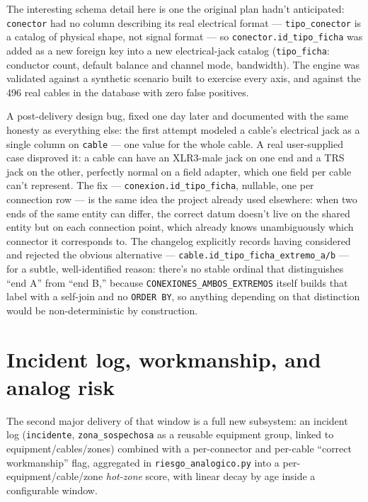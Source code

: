 \documentclass[10.4pt,twocolumn]{article}
\begin{document}
The interesting schema detail here is one the original plan hadn't anticipated: \texttt{conector} had no column describing its real electrical format --- \texttt{tipo\_conector} is a catalog of physical shape, not signal format --- so \texttt{conector.id\_tipo\_ficha} was added as a new foreign key into a new electrical-jack catalog (\texttt{tipo\_ficha}: conductor count, default balance and channel mode, bandwidth). The engine was validated against a synthetic scenario built to exercise every axis, and against the 496 real cables in the database with zero false positives.

A post-delivery design bug, fixed one day later and documented with the same honesty as everything else: the first attempt modeled a cable's electrical jack as a single column on \texttt{cable} --- one value for the whole cable. A real user-supplied case disproved it: a cable can have an XLR3-male jack on one end and a TRS jack on the other, perfectly normal on a field adapter, which one field per cable can't represent. The fix --- \texttt{conexion.id\_tipo\_ficha}, nullable, one per connection row --- is the same idea the project already used elsewhere: when two ends of the same entity can differ, the correct datum doesn't live on the shared entity but on each connection point, which already knows unambiguously which connector it corresponds to. The changelog explicitly records having considered and rejected the obvious alternative --- \texttt{cable.id\_tipo\_ficha\_extremo\_a/b} --- for a subtle, well-identified reason: there's no stable ordinal that distinguishes ``end A'' from ``end B,'' because \texttt{CONEXIONES\_AMBOS\_EXTREMOS} itself builds that label with a self-join and no \texttt{ORDER BY}, so anything depending on that distinction would be non-deterministic by construction.

\section{Incident log, workmanship, and analog risk}

The second major delivery of that window is a full new subsystem: an incident log (\texttt{incidente}, \texttt{zona\_sospechosa} as a reusable equipment group, linked to equipment/cables/zones) combined with a per-connector and per-cable ``correct workmanship'' flag, aggregated in \texttt{riesgo\_analogico.py} into a per-equipment/cable/zone \emph{hot-zone} score, with linear decay by age inside a configurable window.
\end{document}
